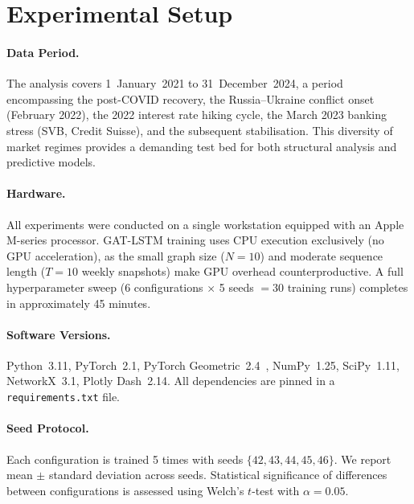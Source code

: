 \section{Experimental Setup}
\label{sec:exp-setup}

\paragraph{Data Period.}
The analysis covers 1~January~2021 to 31~December~2024, a period encompassing the post-COVID recovery, the Russia--Ukraine conflict onset (February 2022), the 2022 interest rate hiking cycle, the March 2023 banking stress (SVB, Credit Suisse), and the subsequent stabilisation. This diversity of market regimes provides a demanding test bed for both structural analysis and predictive models.

\paragraph{Hardware.}
All experiments were conducted on a single workstation equipped with an Apple M-series processor. GAT-LSTM training uses CPU execution exclusively (no GPU acceleration), as the small graph size ($N=10$) and moderate sequence length ($T=10$ weekly snapshots) make GPU overhead counterproductive. A full hyperparameter sweep (6 configurations $\times$ 5 seeds $= 30$ training runs) completes in approximately 45 minutes.

\paragraph{Software Versions.}
Python~3.11, PyTorch~2.1, PyTorch Geometric~2.4~\cite{fey2019fast}, NumPy~1.25, SciPy~1.11, NetworkX~3.1, Plotly Dash~2.14. All dependencies are pinned in a \texttt{requirements.txt} file.

\paragraph{Seed Protocol.}
Each configuration is trained 5 times with seeds $\{42, 43, 44, 45, 46\}$. We report mean $\pm$ standard deviation across seeds. Statistical significance of differences between configurations is assessed using Welch's $t$-test with $\alpha = 0.05$.


